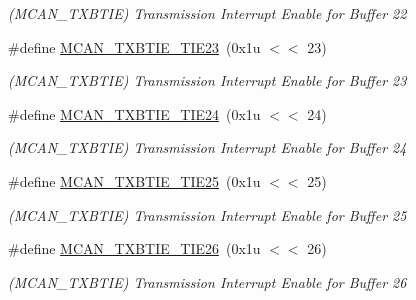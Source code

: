 \begin{DoxyCompactItemize}
\begin{DoxyCompactList}\small\item\em (M\+C\+A\+N\+\_\+\+T\+X\+B\+T\+IE) Transmission Interrupt Enable for Buffer 22 \end{DoxyCompactList}\item 
\mbox{\label{group__SAME70__MCAN_ga81e96f8dbcee1c2738783bae7a7c834c}} 
\#define \mbox{\hyperlink{group__SAME70__MCAN_ga81e96f8dbcee1c2738783bae7a7c834c}{M\+C\+A\+N\+\_\+\+T\+X\+B\+T\+I\+E\+\_\+\+T\+I\+E23}}~(0x1u $<$$<$ 23)
\begin{DoxyCompactList}\small\item\em (M\+C\+A\+N\+\_\+\+T\+X\+B\+T\+IE) Transmission Interrupt Enable for Buffer 23 \end{DoxyCompactList}\item 
\mbox{\label{group__SAME70__MCAN_ga8b1eb7aaf2c8bc3b73c5c718d5ea3427}} 
\#define \mbox{\hyperlink{group__SAME70__MCAN_ga8b1eb7aaf2c8bc3b73c5c718d5ea3427}{M\+C\+A\+N\+\_\+\+T\+X\+B\+T\+I\+E\+\_\+\+T\+I\+E24}}~(0x1u $<$$<$ 24)
\begin{DoxyCompactList}\small\item\em (M\+C\+A\+N\+\_\+\+T\+X\+B\+T\+IE) Transmission Interrupt Enable for Buffer 24 \end{DoxyCompactList}\item 
\mbox{\label{group__SAME70__MCAN_ga2d2148fc83edec3fdf8ecf7d8fd20c40}} 
\#define \mbox{\hyperlink{group__SAME70__MCAN_ga2d2148fc83edec3fdf8ecf7d8fd20c40}{M\+C\+A\+N\+\_\+\+T\+X\+B\+T\+I\+E\+\_\+\+T\+I\+E25}}~(0x1u $<$$<$ 25)
\begin{DoxyCompactList}\small\item\em (M\+C\+A\+N\+\_\+\+T\+X\+B\+T\+IE) Transmission Interrupt Enable for Buffer 25 \end{DoxyCompactList}\item 
\mbox{\label{group__SAME70__MCAN_ga8093c72d3f171c46c908cd59846a351d}} 
\#define \mbox{\hyperlink{group__SAME70__MCAN_ga8093c72d3f171c46c908cd59846a351d}{M\+C\+A\+N\+\_\+\+T\+X\+B\+T\+I\+E\+\_\+\+T\+I\+E26}}~(0x1u $<$$<$ 26)
\begin{DoxyCompactList}\small\item\em (M\+C\+A\+N\+\_\+\+T\+X\+B\+T\+IE) Transmission Interrupt Enable for Buffer 26 \end{DoxyCompactList}\item 

\end{DoxyCompactItemize}
